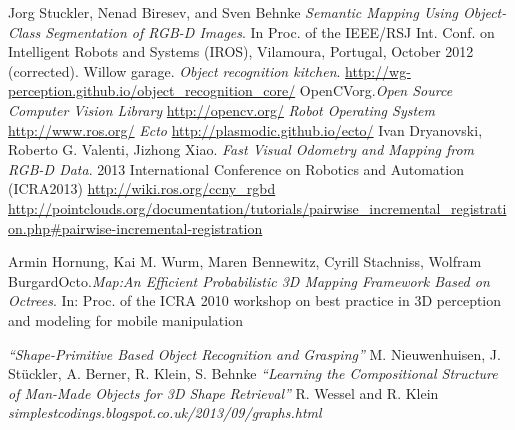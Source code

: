 \documentclass[fontsize=12pt]{article}
\begin{document}
\begin{thebibliography}{9}

  Jorg Stuckler, Nenad Biresev, and Sven Behnke
  \emph{ Semantic Mapping Using Object-Class
Segmentation of RGB-D Images}.
  In Proc. of the IEEE/RSJ Int. Conf. on Intelligent Robots and Systems (IROS), Vilamoura, Portugal, October 2012 (corrected).
  Willow garage. 
  \emph{Object recognition kitchen}. 
  \url{http://wg-perception.github.io/object_recognition_core/}
  OpenCVorg.\emph{Open Source Computer Vision Library}
  \url{http://opencv.org/}
  \emph{Robot Operating System}
  \url{http://www.ros.org/}
  \emph{Ecto}
  \url{http://plasmodic.github.io/ecto/}
  Ivan Dryanovski, Roberto G. Valenti, Jizhong Xiao. \emph{Fast Visual Odometry and Mapping from RGB-D Data}. 2013 International Conference on Robotics and Automation (ICRA2013)
  \url{http://wiki.ros.org/ccny_rgbd}
  \url{http://pointclouds.org/documentation/tutorials/pairwise_incremental_registration.php#pairwise-incremental-registration}
  
   Armin Hornung, Kai M. Wurm, Maren Bennewitz, Cyrill Stachniss, Wolfram BurgardOcto.\emph{Map:An Efficient Probabilistic 3D Mapping Framework Based on Octrees}. In: Proc. of the ICRA 2010 workshop on best practice in 3D perception and modeling for mobile manipulation
   
    \emph{“Shape-Primitive Based Object Recognition and Grasping”} M. Nieuwenhuisen, J. Stückler, A. Berner, R. Klein, S. Behnke
   \emph{“Learning the Compositional Structure of Man-Made Objects for 3D Shape Retrieval”} R. Wessel and R. Klein
   \emph{simplestcodings.blogspot.co.uk/2013/09/graphs.html}
\end{thebibliography}
\end{document}
